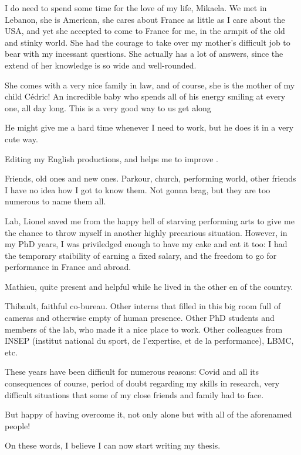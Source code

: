 I do need to spend some time for the love of my life, Mikaela. We met in Lebanon, she is American, she cares about France as little as I care about the USA, and yet she accepted to come to France for me, in the armpit of the old and stinky world. She had the courage to take over my mother's difficult job to bear with my incessant questions. She actually has a lot of answers, since the extend of her knowledge is so wide and well-rounded. 

She comes with a very nice family in law, and of course, she is the mother of my child Cédric! An incredible baby who spends all of his energy smiling at every one, all day long. This is a very good way to us get along


He might give me a hard time whenever I need to work, but he does it in a very cute way. 



Editing my English productions, and helps me to improve .




Friends, old ones and new ones. Parkour, church, performing world, other friends I have no idea how I got to know them. Not gonna brag, but they are too numerous to name them all. 

Lab, Lionel saved me from the happy hell of starving performing arts to give me the chance to throw myself in another highly precarious situation. However, in my PhD years, I was priviledged enough to have my cake and eat it too: I had the temporary staibility of earning a fixed salary, and the freedom to go for performance in France and abroad.

Mathieu, quite present and helpful while he lived in the other en of the country.

Thibault, faithful co-bureau. Other interns that filled in this big room full of cameras and otherwise empty of human presence. Other PhD students and members of the lab, who made it a nice place to work. Other colleagues from INSEP (institut national du sport, de l'expertise, et de la performance), LBMC, etc.

These years have been difficult for numerous reasons: Covid and all its consequences of course, period of doubt regarding my skills in research, very difficult situations that some of my close friends and family had to face.

But happy of having overcome it, not only alone but with all of the aforenamed people!

On these words, I believe I can now start writing my thesis.